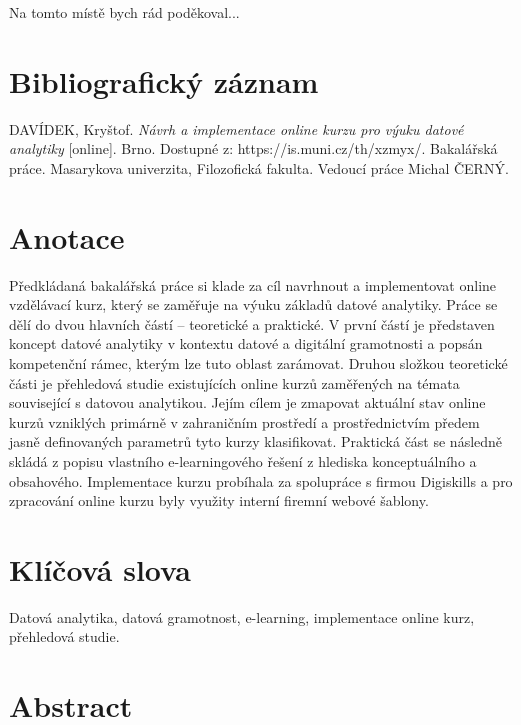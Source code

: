 \documentclass[a4paper,12pt,openany,twoside]{book} %
\begin{document}
\par
\par\vspace*{\fill}

Na tomto místě bych rád poděkoval...

\clearpage

\section*{Bibliografický záznam}

DAVÍDEK, Kryštof. \textit{Návrh a implementace online kurzu pro výuku datové analytiky} [online]. Brno. Dostupné z: https://is.muni.cz/th/xzmyx/. Bakalářská práce. Masarykova univerzita, Filozofická fakulta. Vedoucí práce Michal ČERNÝ.

\section*{Anotace}

Předkládaná bakalářská práce si klade za cíl navrhnout a implementovat online vzdělávací kurz, který se zaměřuje na výuku základů datové analytiky. Práce se dělí do dvou hlavních částí – teoretické a praktické. V první částí je představen koncept datové analytiky v kontextu datové a digitální gramotnosti a popsán kompetenční rámec, kterým lze tuto oblast zarámovat. Druhou složkou teoretické části je přehledová studie existujících online kurzů zaměřených na témata související s datovou analytikou. Jejím cílem je zmapovat aktuální stav online kurzů vzniklých primárně v zahraničním prostředí a prostřednictvím předem jasně definovaných parametrů tyto kurzy klasifikovat. Praktická část se následně skládá z popisu vlastního e-learningového řešení z hlediska konceptuálního a obsahového. Implementace kurzu probíhala za spolupráce s firmou Digiskills a pro zpracování online kurzu byly využity interní firemní webové šablony.

\section*{Klíčová slova}
 
Datová analytika, datová gramotnost, e-learning, implementace online kurz, přehledová studie.

\clearpage

\section*{Abstract}
\end{document}
